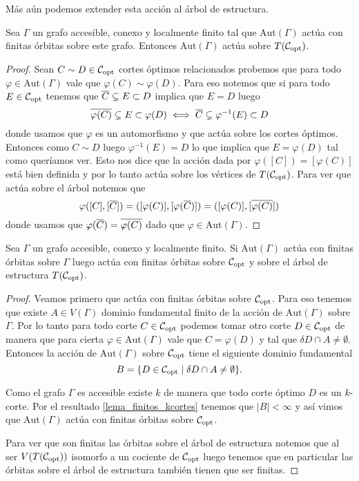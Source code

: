 \documentclass[tesis.tex]{subfiles}
\newcommand{\aut}{\text{Aut}}
\begin{document}
Más aún podemos extender esta acción al árbol de estructura.

\begin{coro}
	Sea $\Gamma$ un grafo accesible, conexo y localmente finito tal que $\aut(\Gamma)$ actúa con finitas órbitas sobre este grafo.
	Entonces $\aut(\Gamma)$ actúa sobre $T({\cal C}_{\text{opt}})$.
\end{coro}

\begin{proof}
	Sean $C \sim D \in {\cal C}_{\text{opt}}$ cortes óptimos relacionados probemos que para todo $\varphi \in \aut(\Gamma)$ vale que $\varphi(C) \sim \varphi(D)$.
	Para eso notemos que si para todo $E \in {\cal C}_{\text{opt}}$ tenemos que 
	$\overline C \subsetneq E \subset D$ implica que $E = D$ luego
	\[
	\overline {\varphi(C)} \subsetneq E \subset \varphi(D) \iff \overline C \subsetneq \varphi^{-1}(E) \subset D
	\]  
	donde usamos que $\varphi$ es un automorfismo y que actúa sobre los cortes óptimos.
	Entonces como $C \sim D$ luego $\varphi^{-1}(E) = D$ lo que implica que $E = \varphi(D)$ tal como queríamos ver.
	Esto nos dice que la acción dada por $\varphi([C]) = [\varphi (C)]$ está bien definida y por lo tanto actúa sobre los vértices de $T({\cal C}_{\text{opt}})$.
	Para ver que actúa sobre el árbol notemos que 
	\[
		\varphi([C],[\overline C]) = ([\varphi (C)], [\varphi (\overline C)]) = ([\varphi (C)], [\overline{\varphi (C)}])
	\]
	donde usamos que $\varphi(\overline{C}) = \overline{\varphi(C)}$ dado que $\varphi \in \aut(\Gamma)$.
	
\end{proof}


\begin{lema}\label{lema_finitas_orbitas}
	Sea $\Gamma$ un grafo accesible, conexo y localmente finito.
	Si $\aut(\Gamma)$ actúa con finitas órbitas sobre $\Gamma$ luego actúa con finitas órbitas sobre ${\cal C}_{\text{opt}}$ y sobre el árbol de estructura $T({\cal C}_{\text{opt}})$.
\end{lema} 
\begin{proof}
	Veamos primero que actúa con finitas órbitas sobre ${\cal C}_{\text{opt}}$.
	Para eso tenemos que existe $A \in V(\Gamma)$ dominio fundamental finito de la acción de $\aut(\Gamma)$ sobre $\Gamma$.
	Por lo tanto para todo corte $C \in {\cal C}_{\text{opt}}$ podemos tomar otro corte $D \in {\cal C}_{\text{opt}}$ de manera que para cierta $\varphi \in \aut(\Gamma)$ vale que $C  = \varphi(D)$ y tal que $\delta D \cap A \neq \emptyset$.
	Entonces la acción de $\aut(\Gamma)$ sobre ${\cal C}_{\text{opt}}$ tiene el siguiente dominio fundamental
	\[
		B = \{  D \in {\cal C}_{\text{opt}} \mid \delta D \cap A \neq \emptyset \}.
	\]
	
	Como el grafo $\Gamma$ es accesible existe $k$ de manera que todo corte óptimo $D$ es un $k$-corte.
	Por el resultado \ref{lema_finitos_kcortes} tenemos que $|B| < \infty$ y así vimos que $\aut(\Gamma)$ actúa con finitas órbitas sobre ${\cal C}_{\text{opt}}$. 
	
	Para ver que son finitas las órbitas sobre el árbol de estructura notemos que al ser $V(T({\cal C}_{\text{opt}}))$ isomorfo a un cociente de ${\cal C}_{\text{opt}}$ luego tenemos que en particular las órbitas sobre el árbol de estructura también tienen que ser finitas.
	
\end{proof}
\end{document}
